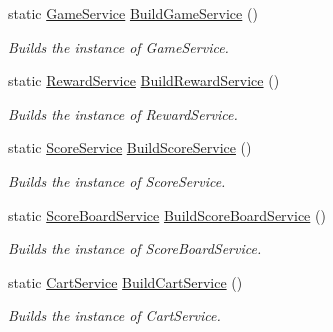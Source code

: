 \begin{DoxyCompactItemize}
static \hyperlink{classcom_1_1shephertz_1_1app42_1_1paas_1_1sdk_1_1csharp_1_1game_1_1_game_service}{Game\+Service} \hyperlink{classcom_1_1shephertz_1_1app42_1_1paas_1_1sdk_1_1csharp_1_1_app42_a_p_i_aaef3196c7bbf5f81601a35a054d9e787}{Build\+Game\+Service} ()
\begin{DoxyCompactList}\small\item\em Builds the instance of Game\+Service. \end{DoxyCompactList}\item 
static \hyperlink{classcom_1_1shephertz_1_1app42_1_1paas_1_1sdk_1_1csharp_1_1reward_1_1_reward_service}{Reward\+Service} \hyperlink{classcom_1_1shephertz_1_1app42_1_1paas_1_1sdk_1_1csharp_1_1_app42_a_p_i_a125ab303239125797e057512f7589818}{Build\+Reward\+Service} ()
\begin{DoxyCompactList}\small\item\em Builds the instance of Reward\+Service. \end{DoxyCompactList}\item 
static \hyperlink{classcom_1_1shephertz_1_1app42_1_1paas_1_1sdk_1_1csharp_1_1game_1_1_score_service}{Score\+Service} \hyperlink{classcom_1_1shephertz_1_1app42_1_1paas_1_1sdk_1_1csharp_1_1_app42_a_p_i_aeb2e14de9a9517aaf1e6c1854e911207}{Build\+Score\+Service} ()
\begin{DoxyCompactList}\small\item\em Builds the instance of Score\+Service. \end{DoxyCompactList}\item 
static \hyperlink{classcom_1_1shephertz_1_1app42_1_1paas_1_1sdk_1_1csharp_1_1game_1_1_score_board_service}{Score\+Board\+Service} \hyperlink{classcom_1_1shephertz_1_1app42_1_1paas_1_1sdk_1_1csharp_1_1_app42_a_p_i_ae08ac0ee2c86d3e5fd17a4e962d0d1fc}{Build\+Score\+Board\+Service} ()
\begin{DoxyCompactList}\small\item\em Builds the instance of Score\+Board\+Service. \end{DoxyCompactList}\item 
static \hyperlink{classcom_1_1shephertz_1_1app42_1_1paas_1_1sdk_1_1csharp_1_1shopping_1_1_cart_service}{Cart\+Service} \hyperlink{classcom_1_1shephertz_1_1app42_1_1paas_1_1sdk_1_1csharp_1_1_app42_a_p_i_a202120c553c4f02f4632d7f0717e0dcd}{Build\+Cart\+Service} ()
\begin{DoxyCompactList}\small\item\em Builds the instance of Cart\+Service. \end{DoxyCompactList}\item 

\end{DoxyCompactItemize}
